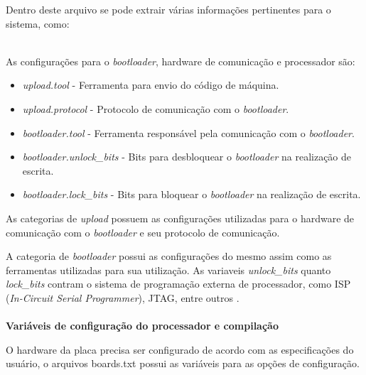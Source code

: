 

Dentro deste arquivo se pode extrair várias informações pertinentes para o sistema, como:
\\
\\

As configurações para o \textit{bootloader}, hardware de comunicação e processador são:

\begin{itemize}
\item \textit{upload.tool} - Ferramenta para envio do código de máquina.

\item \textit{upload.protocol} - Protocolo de comunicação com o \textit{bootloader}.


\item \textit{bootloader.tool} - Ferramenta responsável pela comunicação com o \textit{bootloader}.

\item \textit{bootloader.unlock\_bits} - Bits para desbloquear o \textit{bootloader} na realização de escrita.

\item \textit{bootloader.lock\_bits} - Bits para bloquear o \textit{bootloader} na realização de escrita.

\end{itemize}

As categorias de \textit{upload} possuem as configurações utilizadas para o hardware de comunicação com o \textit{bootloader} e seu protocolo de comunicação.

A categoria de \textit{bootloader} possui as configurações do mesmo assim como as ferramentas utilizadas para sua utilização. As variaveis \textit{unlock\_bits} quanto \textit{lock\_bits} contram o sistema de programação externa de processador, como ISP (\textit{In-Circuit Serial Programmer}), JTAG, entre outros \cite{fuseSettings}. 
\\
\\
\textbf{Variáveis de configuração do processador e compilação}

O hardware da placa precisa ser configurado de acordo com as especificações do usuário, o arquivos boards.txt possui as variáveis para as opções de configuração.

